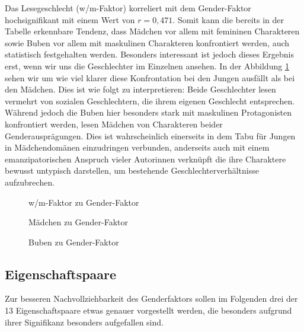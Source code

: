 

Das Lesegeschlecht (w/m-Faktor) korreliert mit dem Gender-Faktor
hochsignifikant mit einem Wert von $r = 0{,}471$. Somit kann die bereits
in der Tabelle erkennbare Tendenz, dass Mädchen vor allem mit femininen
Charakteren sowie Buben vor allem mit maskulinen Charakteren
konfrontiert werden, auch statistisch festgehalten werden. Besonders
interessant ist jedoch dieses Ergebnis erst, wenn wir uns die
Geschlechter im Einzelnen ansehen. In der Abbildung \ref{wm-gender}
sehen wir um wie viel klarer diese Konfrontation bei den Jungen ausfällt
als bei den Mädchen. Dies ist wie folgt zu interpretieren: Beide
Geschlechter lesen vermehrt von sozialen Geschlechtern, die ihrem
eigenen Geschlecht entsprechen. Während jedoch die Buben hier besonders
stark mit maskulinen Protagonisten konfrontiert werden, lesen Mädchen
von Charakteren beider Genderausprägungen. Dies ist wahrscheinlich
einerseits in dem Tabu für Jungen in Mädchendomänen einzudringen
verbunden, anderseits auch mit einem emanzipatorischen Anspruch vieler
Autorinnen verknüpft die ihre Charaktere bewusst untypisch darstellen,
um bestehende Geschlechterverhältnisse aufzubrechen.

\begin{figure}
\center
  \caption[w/m-Faktor--Gender-Faktor]{w/m-Faktor zu Gender-Faktor}
  \label{wm-gender}


\end{figure}

\begin{figure}
\center
  \caption[Mädchen--Gender-Faktor]{Mädchen zu Gender-Faktor}
  \label{w-gender}


\end{figure}

\begin{figure}
\center
  \caption[Buben--Gender-Faktor]{Buben zu Gender-Faktor}
  \label{m-gender}


\end{figure}

\subsection{Eigenschaftspaare}

Zur besseren Nachvollziehbarkeit des Genderfaktors sollen im Folgenden
drei der 13 Eigenschaftspaare etwas genauer vorgestellt werden, die
besonders aufgrund ihrer Signifikanz besonders aufgefallen sind.

